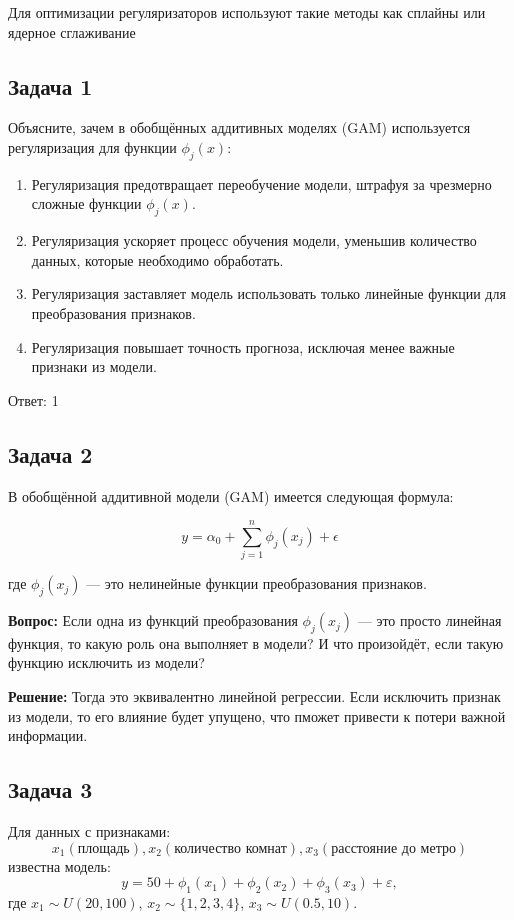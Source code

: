 {Для оптимизации регуляризаторов используют такие методы как сплайны или ядерное сглаживание


\subsection{Задача 1}
Объясните, зачем в обобщённых аддитивных моделях (GAM) используется регуляризация для функции $\phi_j(x)$:
\flushleft
\begin{enumerate}
    \item Регуляризация предотвращает переобучение модели, штрафуя за чрезмерно сложные функции $\phi_j(x)$.

    \item Регуляризация ускоряет процесс обучения модели, уменьшив количество данных, которые необходимо обработать.
    \item Регуляризация заставляет модель использовать только линейные функции для преобразования признаков.
    \item Регуляризация повышает точность прогноза, исключая менее важные признаки из модели.
\end{enumerate}
Ответ: 1

\subsection{Задача 2}

В обобщённой аддитивной модели (GAM) имеется следующая формула:

\[
    y = \alpha_0 + \sum_{j=1}^{n} \phi_j(x_j) + \epsilon
\]

где \( \phi_j(x_j) \) — это нелинейные функции преобразования признаков.


\textbf{Вопрос:} Если одна из функций преобразования \( \phi_j(x_j) \) — это просто линейная функция, то какую роль она выполняет в модели? И что произойдёт, если такую функцию исключить из модели?

\textbf{Решение:}
Тогда это эквивалентно линейной регрессии. Если исключить признак из модели, то его влияние будет упущено, что пможет привести к потери важной информации.





\subsection{Задача 3}
Для данных с признаками:
\[
    x_1 (\text{площадь}),x_2 (\text{количество комнат}),x_3 (\text{расстояние до метро})
\]
известна модель:
\[
    y = 50 + \phi_1(x_1) + \phi_2(x_2) + \phi_3(x_3) + \varepsilon,
\]
где \(x_1 \sim U(20, 100)\), \(x_2 \sim \{1, 2, 3, 4\}\), \(x_3 \sim U(0.5, 10)\).

}
